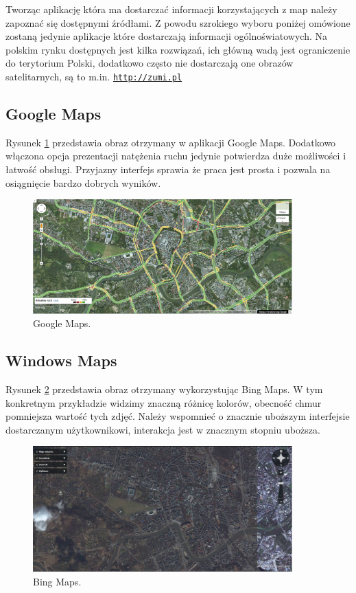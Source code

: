 Tworząc aplikację która ma dostarczać informacji korzystających z map należy zapoznać się dostępnymi źródłami. Z powodu szrokiego wyboru poniżej omówione zostaną jedynie aplikacje które dostarczają informacji ogólnoświatowych. Na polskim rynku dostępnych jest kilka rozwiązań, ich główną wadą jest ograniczenie do terytorium Polski, dodatkowo często nie dostarczają one obrazów satelitarnych, są to m.in. \underline{\texttt{http://zumi.pl}}


\subsection{Google Maps}
\label{subsec:Google Maps}

Rysunek \ref{fig:googleMaps_1} przedstawia obraz otrzymany w aplikacji Google Maps. Dodatkowo włączona opcja prezentacji natężenia ruchu jedynie potwierdza duże możliwości i łatwość obsługi. Przyjazny interfejs sprawia że praca jest prosta i pozwala na osiągnięcie bardzo dobrych wyników.

\begin{figure}[H]
  \centering
    \includegraphics[width=100mm]{ge/gm_1.jpg}
  \caption{Google Maps.}
  \label{fig:googleMaps_1}
\end{figure}


\subsection{Windows Maps}
\label{subsec:Windows Maps}

Rysunek \ref{fig:bingMaps_1} przedstawia obraz otrzymany wykorzystując Bing Maps. W tym konkretnym przykładzie widzimy znaczną różnicę kolorów, obecność chmur pomniejsza wartość tych zdjęć. Należy wspomnieć o znacznie uboższym interfejsie dostarczanym użytkownikowi, interakcja jest w znacznym stopniu uboższa.

\begin{figure}[H]
  \centering
    \includegraphics[width=100mm]{ge/bing_1.jpg}
  \caption{Bing Maps.}
  \label{fig:bingMaps_1}
\end{figure}

